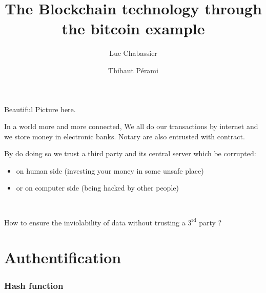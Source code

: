 \documentclass[12pt]{beamer}
\title{The Blockchain technology through the bitcoin example}
\author{Luc Chabassier \and Thibaut Pérami}
\institute{École Normale Supérieure}
\begin{document}
\begin{frame}
Beautiful Picture here. %
\end{frame}

\begin{frame}
    \maketitle
\end{frame}

\begin{frame}
In a world more and more connected, We all do our transactions by internet and we store money in electronic banks. Notary are also entrusted with contract.

By do doing so we trust a third party and its central server which be corrupted:
\begin{itemize}
 \item on human side (investing your money in some unsafe place)
 \item or on computer side (being hacked by other people)
 \end{itemize}

\

How to ensure the inviolability of data without trusting a $3^{\mathrm {rd}}$ party ?

\end{frame}

\begin{frame}

\tableofcontents

\end{frame}

\section{Authentification}

\begin{frame}
    \frametitle{Hash function}
\end{frame}
\end{document}
